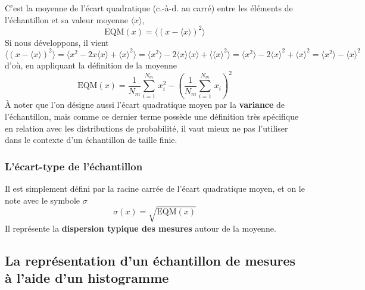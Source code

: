 \documentclass[main.tex]{subfiles}
\begin{document}
C'est la moyenne de l'écart quadratique (c.-à-d. au carré) entre les éléments de l'échantillon et sa valeur moyenne $\langle x\rangle$,
\begin{equation}
    \text{EQM}(x)=\langle (x-\langle x\rangle)^2\rangle
\end{equation}
Si nous développons, il vient
$$
    \langle (x-\langle x\rangle)^2\rangle=\langle x^2-2x\langle x\rangle+\langle x\rangle^2\rangle
    =\langle x^2\rangle-2\langle x\rangle\langle x\rangle+\langle\langle x\rangle^2\rangle
    =\langle x^2\rangle-2\langle x\rangle^2+\langle x\rangle^2
    =\langle x^2\rangle-\langle x\rangle^2
$$
d'où, en appliquant la définition de la moyenne
\begin{equation}
    \text{EQM}(x)=\frac{1}{N_m}\sum\limits_{i=1}^{N_m}\,x_i^2-
    \left(\frac{1}{N_m}\sum\limits_{i=1}^{N_m}\,x_i\right)^2
\end{equation}
À noter que l'on désigne aussi l'écart quadratique moyen par la \textbf{variance} de l'échantillon, mais comme ce dernier terme possède une définition très spécifique en relation avec les distributions de probabilité, il vaut mieux ne pas l'utiliser dans le contexte d'un échantillon de taille finie.

\subsubsection{L'écart-type de l'échantillon}

Il est simplement défini par la racine carrée de l'écart quadratique moyen, et on le note avec le symbole $\sigma$
\begin{equation}
    \sigma(x)=\sqrt{\text{EQM}(x)}
\end{equation}
Il représente la \textbf{dispersion typique des mesures} autour de la moyenne.
\vspace{3mm}
\begin{center}
\end{center}

\subsection{La représentation d'un échantillon de mesures à l'aide d'un histogramme}
\end{document}
